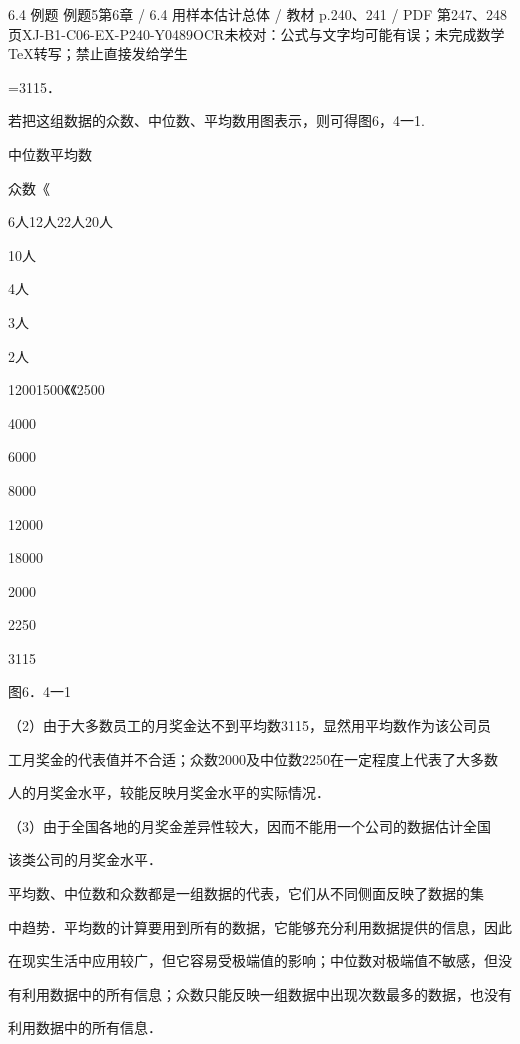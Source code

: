 \begin{bankitem}{6.4 例题 例题5}{第6章 / 6.4 用样本估计总体 / 教材 p.240、241 / PDF 第247、248页}{XJ-B1-C06-EX-P240-Y0489}{OCR未校对：公式与文字均可能有误；未完成数学TeX转写；禁止直接发给学生}
\begin{ocrdraft}
\par
=3115．
\par
若把这组数据的众数、中位数、平均数用图表示，则可得图6，4一1.
\par
中位数平均数
\par
众数《
\par
6人12人22人20人
\par
10人
\par
4人
\par
3人
\par
2人
\par
12001500《《2500
\par
4000
\par
6000
\par
8000
\par
12000
\par
18000
\par
2000
\par
2250
\par
3115
\par
图6．4一1
\par
（2）由于大多数员工的月奖金达不到平均数3115，显然用平均数作为该公司员
\par
[教材p.241 / PDF第248页]
\par
工月奖金的代表值并不合适；众数2000及中位数2250在一定程度上代表了大多数
\par
人的月奖金水平，较能反映月奖金水平的实际情况．
\par
（3）由于全国各地的月奖金差异性较大，因而不能用一个公司的数据估计全国
\par
该类公司的月奖金水平．
\par
平均数、中位数和众数都是一组数据的代表，它们从不同侧面反映了数据的集
\par
中趋势．平均数的计算要用到所有的数据，它能够充分利用数据提供的信息，因此
\par
在现实生活中应用较广，但它容易受极端值的影响；中位数对极端值不敏感，但没
\par
有利用数据中的所有信息；众数只能反映一组数据中出现次数最多的数据，也没有
\par
利用数据中的所有信息．
\end{ocrdraft}
\end{bankitem}
